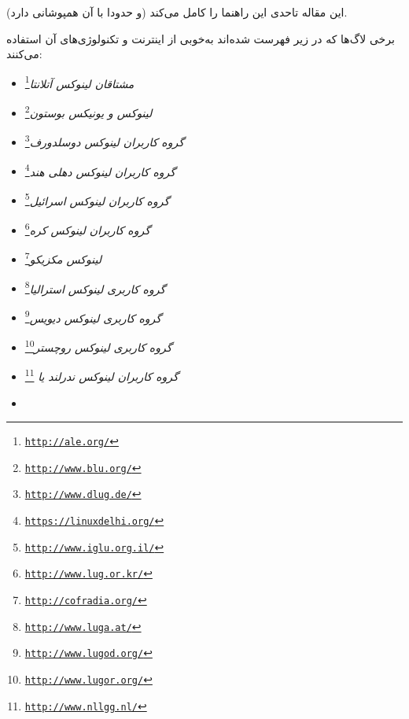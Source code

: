 این مقاله تاحدی این راهنما را کامل می‌کند (و حدودا با آن همپوشانی دارد).

برخی لاگ‌ها که در زیر فهرست شده‌اند به‌خوبی از اینترنت و تکنولوژی‌های آن استفاده می‌کنند:

\begin{itemize}
\item
\emph{مشتاقان لینوکس آتلانتا}\footnote{\texttt{\url{http://ale.org/}}}
\item
\emph{لینوکس و یونیکس بوستون}\footnote{\texttt{\url{http://www.blu.org/}}}
\item
\emph{گروه کاربران لینوکس دوسلدورف}\footnote{\texttt{\url{http://www.dlug.de/}}}
\item
\emph{گروه کاربران لینوکس دهلی هند}\footnote{\texttt{\url{https://linuxdelhi.org/}}}
\item
\emph{گروه کاربران لینوکس اسرائیل}\footnote{\texttt{\url{http://www.iglu.org.il/}}}
\item
\emph{گروه کاربران لینوکس کره}\footnote{\texttt{\url{http://www.lug.or.kr/}}}
\item
\emph{لینوکس مکزیکو}\footnote{\texttt{\url{http://cofradia.org/}}}
\item
\emph{گروه کاربری لینوکس استرالیا}\footnote{\texttt{\url{http://www.luga.at/}}}
\item
\emph{گروه کاربری لینوکس دیویس}\footnote{\texttt{\url{http://www.lugod.org/}}}
\item
\emph{گروه کاربری لینوکس روچستر}\footnote{\texttt{\url{http://www.lugor.org/}}}
\item
\emph{گروه کاربران لینوکس ندرلند یا }\footnote{\texttt{\url{http://www.nllgg.nl/}}}
\item

\end{itemize}

